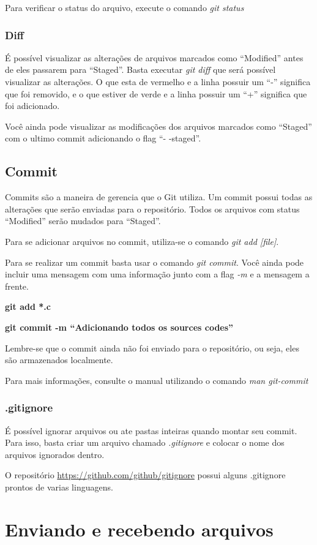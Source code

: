 \documentclass[]{article}
\begin{document}
Para verificar o status do arquivo, execute o comando \textit{git status}
\subsubsection*{Diff}
É possível visualizar as alterações de arquivos marcados como ``Modified'' antes de eles passarem para ``Staged''. 
Basta executar \textit{git diff} que será possível visualizar as alterações.
O que esta de vermelho e a linha possuir um ``-'' significa que foi removido, e o que estiver de verde e a linha possuir um ``+'' significa que foi adicionado.


Você ainda pode visualizar as modificações dos arquivos marcados como ``Staged'' com o ultimo commit adicionando o flag ``- -staged''.

\subsection*{Commit}
Commits são a maneira de gerencia que o Git utiliza. Um commit possui todas as alterações que serão enviadas para o repositório.
Todos os arquivos com status ``Modified'' serão mudados para ``Staged''.

 Para se adicionar arquivos no commit, utiliza-se o comando \textit{git add [file]}.

 Para se realizar um commit basta usar o comando \textit{git commit}. 
 Você ainda pode incluir uma mensagem com uma informação junto com a flag \textit{-m} e a mensagem a frente.

 
 \textbf{git add *.c}


 \textbf{git commit -m ``Adicionando todos os sources codes''}

 Lembre-se que o commit ainda não foi enviado para o repositório, ou seja, eles são armazenados localmente.

 Para mais informações, consulte o manual utilizando o comando \textit{man git-commit}
 \subsubsection*{.gitignore}
 É possível ignorar arquivos ou ate pastas inteiras quando montar seu commit.
 Para isso, basta criar um arquivo chamado \textit{.gitignore} e colocar o nome dos arquivos ignorados dentro.

 O repositório \url{https://github.com/github/gitignore} possui alguns .gitignore prontos de varias linguagens.

 
\section{Enviando e recebendo arquivos}
\end{document}
